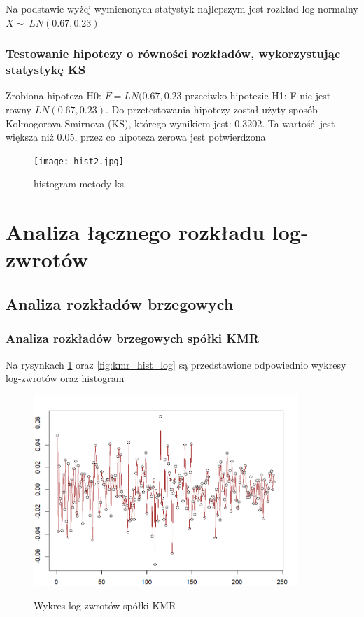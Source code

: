 \documentclass[a4paper,11pt]{article}
\begin{document}
Na podstawie wyżej wymienonych statystyk najlepszym jest rozkład log-normalny $X \sim\ LN(0.67, 0.23)$


\subsubsection{Testowanie hipotezy o równości rozkładów, wykorzystując statystykę KS}

Zrobiona hipoteza H0: $F=LN(0.67, 0.23$ przeciwko hipotezie H1: F nie jest rowny $LN(0.67, 0.23)$. Do przetestowania hipotezy został użyty sposób Kolmogorova-Smirnova (KS), którego wynikiem jest: 0.3202. Ta wartość jest większa niż 0.05, przez co hipoteza zerowa jest potwierdzona
\begin{figure}[htb]
	\centering
	\texttt{[image: hist2.jpg]}
	\caption{histogram metody ks}
\end{figure}

\pagebreak
\section{Analiza łącznego rozkładu log-zwrotów}
\subsection{Analiza rozkładów brzegowych}
\subsubsection{Analiza rozkładów brzegowych spółki KMR}

Na rysynkach \ref{fig:kmr_wykres_log} oraz \ref{fig:kmr_hist_log} są przedstawione odpowiednio wykresy log-zwrotów oraz histogram
\begin{figure}[htb]
	\centering
	\includegraphics[width=10cm]{kmr_wykres_log.png}
        \label{fig:kmr_wykres_log}
	\caption{Wykres log-zwrotów spółki KMR}
\end{figure}
\end{document}
